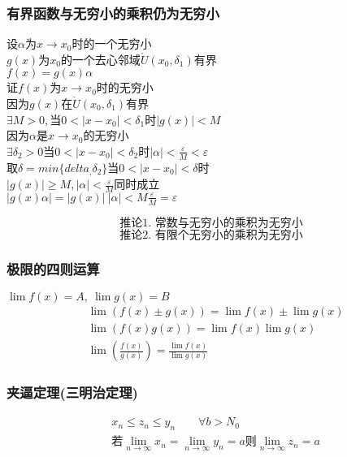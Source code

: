\subsubsection{有界函数与无穷小的乘积仍为无穷小}
\begin{center}
    设$\alpha$为$x\rightarrow x_0$时的一个无穷小\\
$g(x)$为$x_0$的一个去心邻域$\mathring{U}(x_0,\delta_1)$有界\\
$f(x)=g(x)\alpha$\\
证$f(x)$为$x\rightarrow x_0$时的无穷小\\
因为$g(x)\mbox{在}\mathring{U}(x_0,\delta_1)$有界\\
$\exists M>0,\mbox{当}0<\left|x-x_0\right|<\delta_1$时$\left|g(x)\right|<M$\\
因为$\alpha$是$x\rightarrow x_0$的无穷小\\
$\exists\delta_2>0\mbox{当}0<\left|x-x_0\right|<\delta_2$时$\left|\alpha\right|<\frac{\varepsilon}{M}<\varepsilon$\\
取$\delta=min\{delta_,\delta_2\}$当$0<\left|x-x_0\right|<\delta$时\\
$\left|g(x)\right|\geqslant M,\left|\alpha\right|<\frac{\varepsilon}{M}$同时成立\\
$\left|g(x)\alpha\right|=\left|g(x)\right|\ \left|\alpha\right|<M\frac{\varepsilon}{M}=\varepsilon$
\end{center}
$$\mbox{推论1.\ 常数与无穷小的乘积为无穷小}$$
$$\mbox{推论2.\ 有限个无穷小的乘积为无穷小}$$
\subsubsection{极限的四则运算}
$\lim f(x)=A,\ \lim g(x)=B$
\begin{align}
&\lim{(f(x)\pm g(x))} = \lim f(x)\pm\lim g(x) \label{Extreme Four Operations_1}\\
&\lim{(f(x) g(x))} = \lim f(x)\lim g(x) \label{Extreme Four Operations_2}\\
&\lim \left(\frac{f(x)}{g(x)}\right)= \frac{\lim{f(x)}}{\lim{g(x)}} \label{Extreme Four Operations_3}
\end{align}
\subsubsection{夹逼定理(三明治定理)}
\begin{equation}\label{eq:squeeze_theorem}
\begin{split}
&x_n\leqslant z_n\leqslant y_n \qquad \forall b>N_0 \\
&\mbox{若}\lim\limits_{n\to{\infty}}x_n = \lim\limits_{n\to\infty}y_n = a \mbox{则}\lim\limits_{n\to\infty}z_n = a
\end{split}
\end{equation}
